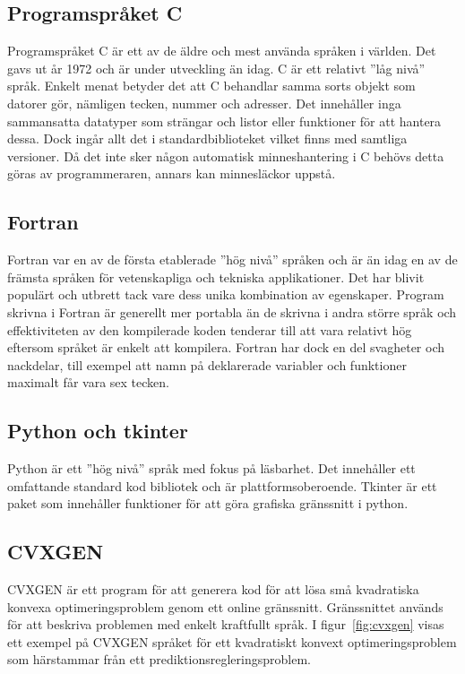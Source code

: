 \subsection{Programspråket C}
Programspråket C är ett av de äldre och mest använda språken i världen. Det gavs ut år 1972 och är under utveckling än idag. C är ett relativt ''låg nivå'' språk. Enkelt menat betyder det att C behandlar samma sorts objekt som datorer gör, nämligen tecken, nummer och adresser. Det innehåller inga sammansatta datatyper som strängar och listor eller funktioner för att hantera dessa. Dock ingår allt det i standardbiblioteket vilket finns med samtliga versioner. Då det inte sker någon automatisk minneshantering i C behövs detta göras av programmeraren, annars kan minnesläckor uppstå. \citep{cbible}

\subsection{Fortran}
Fortran var en av de första etablerade ''hög nivå'' språken och är än idag en av de främsta språken för vetenskapliga och tekniska applikationer. Det har blivit populärt och utbrett tack vare dess unika kombination av egenskaper. Program skrivna i Fortran är generellt mer portabla än de skrivna i andra större språk och effektiviteten av den kompilerade koden tenderar till att vara relativt hög eftersom språket är enkelt att kompilera. Fortran har dock en del svagheter och nackdelar, till exempel att namn på deklarerade variabler och funktioner maximalt får vara sex tecken. \citep{fortran}     

\subsection{Python och tkinter}
Python är ett ''hög nivå'' språk med fokus på läsbarhet. Det innehåller ett omfattande standard kod bibliotek och är plattformsoberoende. \citep{python}  
\newline
\newline
Tkinter är ett paket som innehåller funktioner för att göra grafiska gränssnitt i python. \citep{tkinter}   

\subsection{CVXGEN}
CVXGEN är ett program för att generera kod för att lösa små kvadratiska konvexa optimeringsproblem genom ett online gränssnitt. Gränssnittet används för att beskriva problemen med enkelt kraftfullt språk. \citep{cvxgen} \newline
\newline
I figur~\ref{fig:cvxgen} visas ett exempel på CVXGEN språket för ett kvadratiskt konvext optimeringsproblem som härstammar från ett prediktionsregleringsproblem.   

